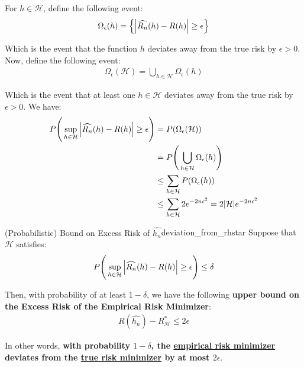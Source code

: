 \begin{proof*}
    For $h\in\mathcal{H}$, define the following event:
    \begin{align*}
        \Omega_\epsilon(h) = \Big\{ 
            \Big| 
                \widehat{R_n}(h) - R(h)
             \Big| \ge \epsilon
         \Big\}
    \end{align*}

    \noindent Which is the event that the function $h$ deviates away from the true risk by $\epsilon>0$. Now, define the following event:
    \begin{align*}
        \Omega_\epsilon(\mathcal{H}) = \bigcup_{h\in\mathcal{H}} \Omega_\epsilon (h)
    \end{align*}

    \noindent Which is the event that at least one $h\in\mathcal{H}$ deviates away from the true risk by $\epsilon>0$. We have:
    \begin{align*}
        P\Bigg( 
            \sup_{h\in\mathcal{H}}\Big| \widehat{R_n}(h) - R(h) \Big| \ge \epsilon
         \Bigg) &= P(\Omega_\epsilon(\mathcal{H})) \\
        &= P\Bigg( 
            \bigcup_{h\in\mathcal{H}} \Omega_\epsilon (h)
         \Bigg) \\
        &\le \sum_{h\in\mathcal{H}} P(\Omega_\epsilon(h)) \\
        &\le \sum_{h\in\mathcal{H}} 2e^{-2n\epsilon^2} = 2|\mathcal{H}|e^{-2n\epsilon^2}
    \end{align*}
\end{proof*}

\begin{proposition}{(Probabilistic) Bound on Excess Risk of $\widehat{h_n}$}{deviation_from_rhstar}
    Suppose that $\mathcal{H}$ satisfies:
    \begin{align*}
        P\Bigg( 
            \sup_{h\in\mathcal{H}}\Big| \widehat{R_n}(h) - R(h) \Big| \ge \epsilon
         \Bigg) \le \delta
    \end{align*}

    \noindent Then, with probability of at least $1-\delta$, we have the following \textbf{upper bound on the Excess Risk of the Empirical Risk Minimizer}:
    \begin{align*}
        R(\widehat{h_n}) - R_\mathcal{H}^* \le 2\epsilon
    \end{align*}

    \noindent In other words, \textbf{with probability $1-\delta$, the \underline{empirical risk minimizer} deviates from the \underline{true risk minimizer} by at most $2\epsilon$}.
\end{proposition}

